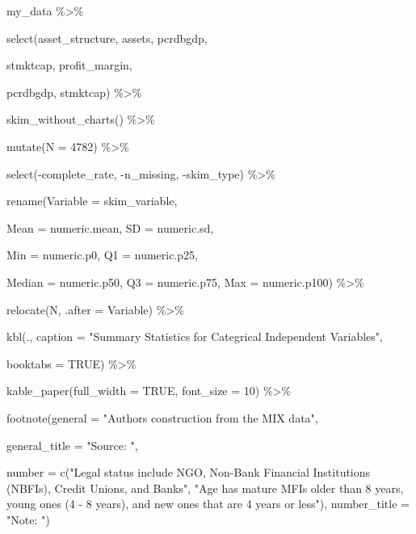 \documentclass[a4paper,nobind]{templates/ociamthesis}
\newenvironment{Shaded}{\begin{snugshade}}{\end{snugshade}}
\newcommand{\AttributeTok}[1]{\textcolor[rgb]{0.77,0.63,0.00}{#1}}
\newcommand{\ConstantTok}[1]{\textcolor[rgb]{0.00,0.00,0.00}{#1}}
\newcommand{\DecValTok}[1]{\textcolor[rgb]{0.00,0.00,0.81}{#1}}
\newcommand{\FunctionTok}[1]{\textcolor[rgb]{0.00,0.00,0.00}{#1}}
\newcommand{\NormalTok}[1]{#1}
\newcommand{\SpecialCharTok}[1]{\textcolor[rgb]{0.00,0.00,0.00}{#1}}
\newcommand{\StringTok}[1]{\textcolor[rgb]{0.31,0.60,0.02}{#1}}
\renewenvironment{Shaded}
{
  \vspace{10pt}%
  \begin{snugshade}%
}{%
  \end{snugshade}%
  \vspace{8pt}%
}
\begin{document}
\begin{Shaded}
\begin{Highlighting}[]
\NormalTok{my\_data }\SpecialCharTok{\%\textgreater{}\%} 
  
  \FunctionTok{select}\NormalTok{(asset\_structure, assets, pcrdbgdp, }
         
\NormalTok{         stmktcap, profit\_margin, }
         
\NormalTok{         pcrdbgdp, stmktcap) }\SpecialCharTok{\%\textgreater{}\%} 
  
  \FunctionTok{skim\_without\_charts}\NormalTok{() }\SpecialCharTok{\%\textgreater{}\%} 
  
  \FunctionTok{mutate}\NormalTok{(}\AttributeTok{N =} \DecValTok{4782}\NormalTok{) }\SpecialCharTok{\%\textgreater{}\%} 
  
  \FunctionTok{select}\NormalTok{(}\SpecialCharTok{{-}}\NormalTok{complete\_rate, }\SpecialCharTok{{-}}\NormalTok{n\_missing, }\SpecialCharTok{{-}}\NormalTok{skim\_type) }\SpecialCharTok{\%\textgreater{}\%} 

  \FunctionTok{rename}\NormalTok{(}\AttributeTok{Variable =}\NormalTok{ skim\_variable, }
         
         \AttributeTok{Mean =}\NormalTok{ numeric.mean, }\AttributeTok{SD =}\NormalTok{ numeric.sd, }
         
         \AttributeTok{Min =}\NormalTok{ numeric.p0, }\AttributeTok{Q1 =}\NormalTok{ numeric.p25,}
         
         \AttributeTok{Median =}\NormalTok{ numeric.p50, }\AttributeTok{Q3 =}\NormalTok{ numeric.p75, }\AttributeTok{Max =}\NormalTok{ numeric.p100) }\SpecialCharTok{\%\textgreater{}\%} 
  
  \FunctionTok{relocate}\NormalTok{(N, }\AttributeTok{.after =}\NormalTok{ Variable) }\SpecialCharTok{\%\textgreater{}\%} 
  
  \FunctionTok{kbl}\NormalTok{(., }\AttributeTok{caption =} \StringTok{"Summary Statistics for Categrical Independent Variables"}\NormalTok{, }
      
      \AttributeTok{booktabs =} \ConstantTok{TRUE}\NormalTok{) }\SpecialCharTok{\%\textgreater{}\%} 
  
  \FunctionTok{kable\_paper}\NormalTok{(}\AttributeTok{full\_width =} \ConstantTok{TRUE}\NormalTok{, }\AttributeTok{font\_size =} \DecValTok{10}\NormalTok{) }\SpecialCharTok{\%\textgreater{}\%} 
  
  \FunctionTok{footnote}\NormalTok{(}\AttributeTok{general =} \StringTok{"Authors\textquotesingle{} construction from the MIX data"}\NormalTok{,}
           
           \AttributeTok{general\_title =} \StringTok{"Source: "}\NormalTok{,}
           
           \AttributeTok{number =} \FunctionTok{c}\NormalTok{(}\StringTok{"Legal status include NGO, Non{-}Bank Financial Institutions (NBFIs), Credit Unions, and Banks"}\NormalTok{, }\StringTok{"Age has mature MFIs older than 8 years, young ones (4 {-} 8 years), and new ones that are 4 years or less"}\NormalTok{),}
           \AttributeTok{number\_title =} \StringTok{"Note: "}\NormalTok{)}
\end{Highlighting}
\end{Shaded}
\end{document}
